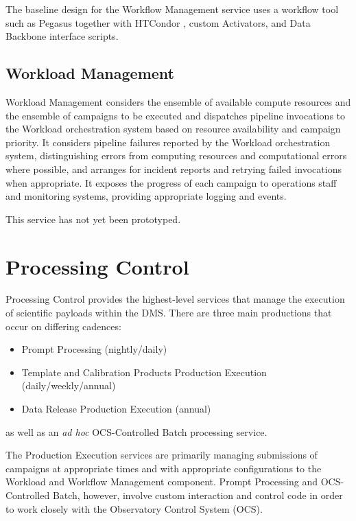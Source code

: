 \documentclass[DM,lsstdraft,toc]{lsstdoc}
\begin{document}
The baseline design for the Workflow Management service uses a workflow tool
such as Pegasus \citep{Pegasus} together with HTCondor \citep{HTCondor}, custom
Activators, and Data Backbone interface scripts.

\subsection{Workload Management}\label{workload-management}

Workload Management considers the ensemble of available compute resources and
the ensemble of campaigns to be executed and dispatches pipeline invocations to
the Workload orchestration system based on resource availability and campaign
priority.  It considers pipeline failures reported by the Workload
orchestration system, distinguishing errors from computing resources and
computational errors where possible, and arranges for incident reports and
retrying failed invocations when appropriate.  It exposes the progress of each
campaign to operations staff and monitoring systems, providing appropriate
logging and events.

This service has not yet been prototyped.


\section{Processing Control}\label{processing-control}

Processing Control provides the highest-level services that manage the
execution of scientific payloads within the DMS.  There are three main
productions that occur on differing cadences:
\begin{itemize}
	\item Prompt Processing (nightly/daily)
	\item Template and Calibration Products Production Execution (daily/weekly/annual)
	\item Data Release Production Execution (annual)
\end{itemize}
as well as an \textit{ad hoc} OCS-Controlled Batch processing service.

The Production Execution services are primarily managing submissions of
campaigns at appropriate times and with appropriate configurations to the
Workload and Workflow Management component.  Prompt Processing and
OCS-Controlled Batch, however, involve custom interaction and control code in
order to work closely with the Observatory Control System (OCS).
\end{document}
